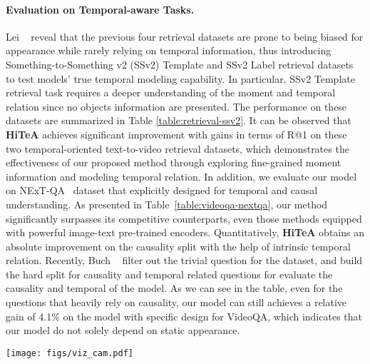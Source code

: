 \documentclass[10pt,twocolumn,letterpaper]{article}
\newcommand{\modelname}{\textbf{HiTeA}\xspace}
\begin{document}
\paragraph{Evaluation on Temporal-aware Tasks.}
Lei \etal~\cite{lei2022singularity} reveal that the previous four retrieval datasets are prone to being biased for appearance while rarely relying on temporal information, thus introducing Something-to-Something v2 (SSv2) Template and SSv2 Label retrieval datasets to test models' true temporal modeling capability.
In particular, SSv2 Template retrieval task requires a deeper understanding of the moment and temporal relation since no objects information are presented. The performance on these datasets are summarized in Table \ref{table:retrieval-ssv2}. It can be observed that \modelname achieves significant improvement with  gains in terms of R@1 on these two temporal-oriented text-to-video retrieval datasets, which demonstrates the effectiveness of our proposed method through
exploring fine-grained moment information and modeling temporal relation. In addition, we evaluate our model on NExT-QA~\cite{xiao2021nextqa} dataset that explicitly designed for temporal and causal understanding. 
As presented in Table~\ref{table:videoqa-nextqa},
our method significantly surpasses its competitive counterparts, even those methods equipped with powerful image-text pre-trained encoders. Quantitatively, \modelname obtains an absolute improvement  on the causality split with the help of intrinsic temporal relation. Recently, Buch \etal~\cite{buch2022atp} filter out the trivial question for the dataset, and build the hard split for causality and temporal related questions for evaluate the causality and temporal of the model. As we can see in the table, even for the questions that heavily rely on causality, our model can still achieves a relative gain of 4.1\% on the model with specific design for VideoQA, which indicates that our model do not solely depend on static appearance.

\begin{figure*}
    \centering
    \texttt{[image: figs/viz\_cam.pdf]}
    \vspace{-3ex}
    \caption{Visualizations of learned cross-attention maps from multi-modal encoder. We present samples from MSRVTT \cite{xu2016msrvtt} and SSv2 Template \cite{lei2022singularity} retrieval dataset. \modelname attends to the patches related to objects motion by tracking trajectory. Best viewed in color.}
\label{fig:ssv2_cam}
\vspace{-2ex}
\end{figure*}
\end{document}
